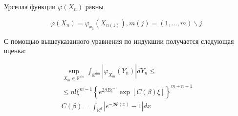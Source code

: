 \documentclass[10pt]{article}
\begin{document}
Урселла функции $\varphi\left(X_{n}\right)$ равны



\[

\varphi\left(X_{n}\right)=\varphi_{x_{1}}\left(X_{n(1)}\right), m(j)=(1, \ldots, m) \backslash j .

\]



С помощью вышеуказанного уравнения по индукшии получается следующая оценка:



\[

\begin{gathered}

\sup _{X_{m} \in \mathbb{R}^{d m}} \int_{\mathbb{R}^{d m}}\left|\varphi_{X_{m}}\left(Y_{n}\right)\right| d Y_{n} \leqslant \\

\leqslant n ! \xi^{m-1}\left\{e^{2 \beta B \xi^{-1}} \exp [C(\beta) \xi]\right\}^{m+n-1} \\

C(\beta)=\int_{\mathbb{R}^{d}}\left|e^{-\beta \Phi(x)}-1\right| d x

\end{gathered}

\]
\end{document}
